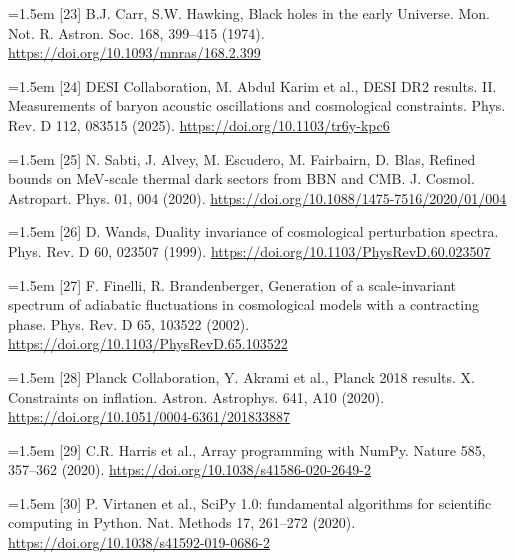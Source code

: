 \documentclass[11pt,a4paper]{article}
\begin{document}
\noindent\hangindent=1.5em [23] B.J. Carr, S.W. Hawking, Black holes in the early Universe. Mon. Not. R. Astron. Soc. 168, 399--415 (1974). \url{https://doi.org/10.1093/mnras/168.2.399}\par
\noindent\hangindent=1.5em [24] DESI Collaboration, M. Abdul Karim et al., DESI DR2 results. II. Measurements of baryon acoustic oscillations and cosmological constraints. Phys. Rev. D 112, 083515 (2025). \url{https://doi.org/10.1103/tr6y-kpc6}\par
\noindent\hangindent=1.5em [25] N. Sabti, J. Alvey, M. Escudero, M. Fairbairn, D. Blas, Refined bounds on MeV-scale thermal dark sectors from BBN and CMB. J. Cosmol. Astropart. Phys. 01, 004 (2020). \url{https://doi.org/10.1088/1475-7516/2020/01/004}\par
\noindent\hangindent=1.5em [26] D. Wands, Duality invariance of cosmological perturbation spectra. Phys. Rev. D 60, 023507 (1999). \url{https://doi.org/10.1103/PhysRevD.60.023507}\par
\noindent\hangindent=1.5em [27] F. Finelli, R. Brandenberger, Generation of a scale-invariant spectrum of adiabatic fluctuations in cosmological models with a contracting phase. Phys. Rev. D 65, 103522 (2002). \url{https://doi.org/10.1103/PhysRevD.65.103522}\par
\noindent\hangindent=1.5em [28] Planck Collaboration, Y. Akrami et al., Planck 2018 results. X. Constraints on inflation. Astron. Astrophys. 641, A10 (2020). \url{https://doi.org/10.1051/0004-6361/201833887}\par
\noindent\hangindent=1.5em [29] C.R. Harris et al., Array programming with NumPy. Nature 585, 357--362 (2020). \url{https://doi.org/10.1038/s41586-020-2649-2}\par
\noindent\hangindent=1.5em [30] P. Virtanen et al., SciPy 1.0: fundamental algorithms for scientific computing in Python. Nat. Methods 17, 261--272 (2020). \url{https://doi.org/10.1038/s41592-019-0686-2}\par
\end{document}
